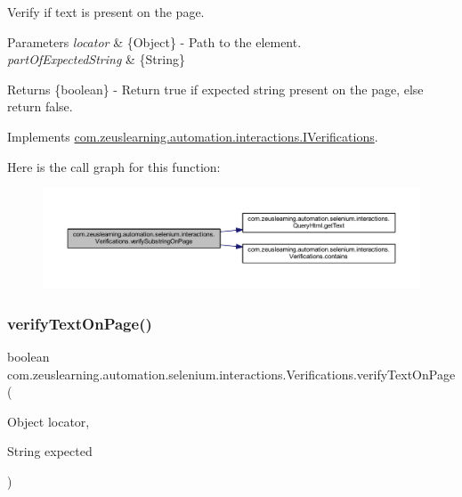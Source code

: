 Verify if text is present on the page.


\begin{DoxyParams}{Parameters}
{\em locator} & \{Object\} -\/ Path to the element. \\
\hline
{\em part\+Of\+Expected\+String} & \{String\} \\
\hline
\end{DoxyParams}
\begin{DoxyReturn}{Returns}
\{boolean\} -\/ Return {\ttfamily true} if expected string present on the page, else return {\ttfamily false}. 
\end{DoxyReturn}


Implements \hyperlink{interfacecom_1_1zeuslearning_1_1automation_1_1interactions_1_1IVerifications_a0fa329dc2ffd80c2bb9afe685ef95bea}{com.\+zeuslearning.\+automation.\+interactions.\+I\+Verifications}.

Here is the call graph for this function\+:
\nopagebreak
\begin{figure}[H]
\begin{center}
\leavevmode
\includegraphics[width=350pt]{d2/d6b/classcom_1_1zeuslearning_1_1automation_1_1selenium_1_1interactions_1_1Verifications_a6fbe5c6cd7a92208444c669cca7cb502_cgraph}
\end{center}
\end{figure}
\hypertarget{classcom_1_1zeuslearning_1_1automation_1_1selenium_1_1interactions_1_1Verifications_a041fe10631722deb8bd5f5f20760cd0c}{}\label{classcom_1_1zeuslearning_1_1automation_1_1selenium_1_1interactions_1_1Verifications_a041fe10631722deb8bd5f5f20760cd0c} 
\subsubsection{\texorpdfstring{verify\+Text\+On\+Page()}{verifyTextOnPage()}}
{\footnotesize\ttfamily boolean com.\+zeuslearning.\+automation.\+selenium.\+interactions.\+Verifications.\+verify\+Text\+On\+Page (\begin{DoxyParamCaption}\item[{Object}]{locator,  }\item[{String}]{expected }\end{DoxyParamCaption})\hspace{0.3cm}{\ttfamily [inline]}}

